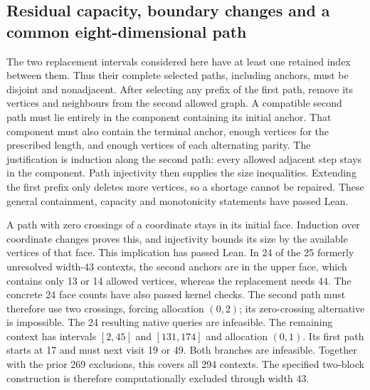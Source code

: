 \documentclass[11pt,a4paper]{article}
\theoremstyle{definition}
\theoremstyle{remark}
\begin{document}
\subsection{Residual capacity, boundary changes and a common eight-dimensional path}
\label{sec:residual226}
The two replacement intervals considered here have at least one retained
index between them. Thus their complete selected paths, including anchors,
must be disjoint and nonadjacent. After selecting any prefix of the first
path, remove its vertices and neighbours from the second allowed graph.
A compatible second path must lie entirely in the component containing
its initial anchor. That component must also contain the terminal anchor,
enough vertices for the prescribed length, and enough vertices of each
alternating parity. The justification is induction along the second path:
every allowed adjacent step stays in the component. Path injectivity
then supplies the size inequalities. Extending the first prefix only
deletes more vertices, so a shortage cannot be repaired. These general
containment, capacity and monotonicity statements have passed Lean.

A path with zero crossings of a coordinate stays in its initial face.
Induction over coordinate changes proves this, and injectivity bounds
its size by the available vertices of that face. This implication has
passed Lean. In 24 of the 25 formerly unresolved width-43 contexts,
the second anchors are in the upper face, which contains only 13 or
14 allowed vertices, whereas the replacement needs 44. The concrete
24 face counts have also passed kernel checks. The second path must
therefore use two crossings, forcing allocation $(0,2)$; its zero-crossing
alternative is impossible. The 24 resulting native queries are infeasible.
The remaining context has intervals $[2,45]$ and $[131,174]$ and allocation
$(0,1)$. Its first path starts at 17 and must next visit 19 or 49.
Both branches are infeasible. Together with the prior 269 exclusions,
this covers all 294 contexts. The specified two-block construction is
therefore computationally excluded through width 43.
\end{document}
